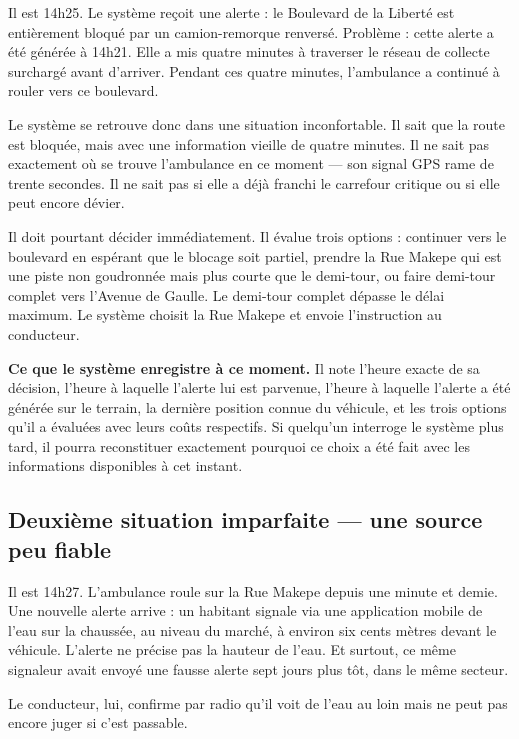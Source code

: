\documentclass[12pt, a4paper]{article}
\begin{document}
Il est 14h25. Le système reçoit une alerte : le Boulevard de la Liberté
est entièrement bloqué par un camion-remorque renversé. Problème : cette
alerte a été générée à 14h21. Elle a mis quatre minutes à traverser le
réseau de collecte surchargé avant d'arriver. Pendant ces quatre minutes,
l'ambulance a continué à rouler vers ce boulevard.

Le système se retrouve donc dans une situation inconfortable. Il sait que
la route est bloquée, mais avec une information vieille de quatre minutes.
Il ne sait pas exactement où se trouve l'ambulance en ce moment — son
signal GPS rame de trente secondes. Il ne sait pas si elle a déjà
franchi le carrefour critique ou si elle peut encore dévier.

Il doit pourtant décider immédiatement. Il évalue trois options : continuer
vers le boulevard en espérant que le blocage soit partiel, prendre la Rue
Makepe qui est une piste non goudronnée mais plus courte que le demi-tour,
ou faire demi-tour complet vers l'Avenue de Gaulle. Le demi-tour complet
dépasse le délai maximum. Le système choisit la Rue Makepe et envoie
l'instruction au conducteur.

\begin{exemple}
\textbf{Ce que le système enregistre à ce moment.}
Il note l'heure exacte de sa décision, l'heure à laquelle l'alerte
lui est parvenue, l'heure à laquelle l'alerte a été générée sur le terrain,
la dernière position connue du véhicule, et les trois options qu'il a
évaluées avec leurs coûts respectifs. Si quelqu'un interroge le système
plus tard, il pourra reconstituer exactement pourquoi ce choix a été fait
avec les informations disponibles à cet instant.
\end{exemple}

\subsection{Deuxième situation imparfaite — une source peu fiable}

Il est 14h27. L'ambulance roule sur la Rue Makepe depuis une minute et
demie. Une nouvelle alerte arrive : un habitant signale via une application
mobile de l'eau sur la chaussée, au niveau du marché, à environ six cents
mètres devant le véhicule. L'alerte ne précise pas la hauteur de l'eau.
Et surtout, ce même signaleur avait envoyé une fausse alerte sept jours
plus tôt, dans le même secteur.

Le conducteur, lui, confirme par radio qu'il voit de l'eau au loin mais
ne peut pas encore juger si c'est passable.
\end{document}
